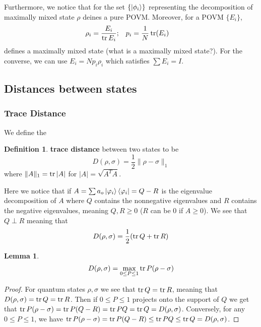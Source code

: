 \documentclass{article}
\newtheorem{lemma}{Lemma}
\theoremstyle{definition}
\newtheorem{definition}{Definition}
\begin{document}
Furthermore, we notice that for the set $\{\ket{\phi_i}\}$ representing the 
decomposition of maximally mixed state $\rho$ deines a pure POVM. Moreover,
for a POVM $\{E_i\}$,
\begin{align}
  \rho_i &= \frac{E_i}{\tr E_i}; & p_i &= \frac{1}{N} \tr(E_i)
\end{align}
defines a maximally mixed state (what is a maximally mixed state?). For the
converse, we can use $E_i = Np_i \rho_i$ which satisfies $\sum E_i = I$.

\subsection{Distances between states}

\subsubsection{Trace Distance}

We define the
\begin{definition}
  \textbf{trace distance} between two states to be
  \begin{equation}
    D(\rho, \sigma) = \frac{1}{2} \| \rho - \sigma \|_1
  \end{equation}
  where $\|A\|_1 = \tr |A|$ for $|A| = \sqrt{A^T A}$.
\end{definition}
Here we notice that if $A = \sum a_o \ket{\varphi_i} \bra{\varphi_i} = Q - R$
is the eigenvalue decomposition of $A$ where $Q$ contains the nonnegative 
eigenvalues and $R$ contains the negative eigenvalues, meaning $Q, R \geq 0$ 
($R$ can be 0 if $A \geq 0$). We see that $Q \perp R$ meaning that
\begin{equation}
  D(\rho, \sigma) = \frac{1}{2}(\tr Q + \tr R)
\end{equation}

\begin{lemma}
  \begin{equation}
    D(\rho, \sigma) = \max_{0 \leq P \leq 1} \tr P(\rho - \sigma)
  \end{equation}
\end{lemma}
\begin{proof}
  For quantum states $\rho, \sigma$ we see that $\tr Q = \tr R$, meaning that
  $D(\rho, \sigma) = \tr Q = \tr R$. Then if $0 \leq P \leq 1$ projects onto
  the support of $Q$ we get that $\tr P(\rho - \sigma) = \tr P(Q - R) = \tr PQ
  = \tr Q = D(\rho, \sigma)$. Conversely, for any $0 \leq P \leq 1$, we have 
  $\tr P (\rho - \sigma) = \tr P(Q - R) \leq \tr PQ \leq \tr Q = 
  D(\rho, \sigma)$.
\end{proof}
\end{document}
